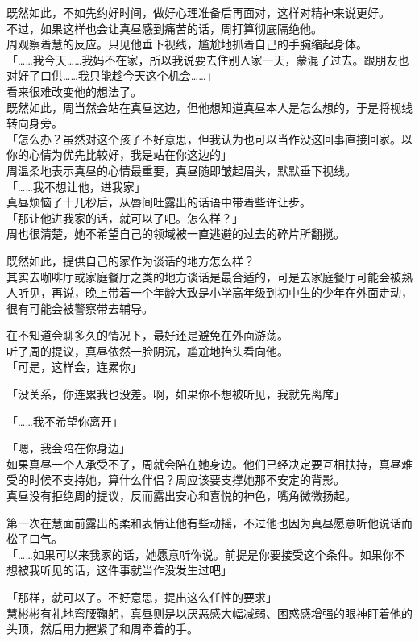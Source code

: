既然如此，不如先约好时间，做好心理准备后再面对，这样对精神来说更好。\\

不过，如果这样也会让真昼感到痛苦的话，周打算彻底隔绝他。\\

周观察着慧的反应。只见他垂下视线，尴尬地抓着自己的手腕缩起身体。\\

「……我今天……我妈不在家，所以我说要去住别人家一天，蒙混了过去。跟朋友也对好了口供……我只能趁今天这个机会……」\\

看来很难改变他的想法了。\\

既然如此，周当然会站在真昼这边，但他想知道真昼本人是怎么想的，于是将视线转向身旁。\\

「怎么办？虽然对这个孩子不好意思，但我认为也可以当作没这回事直接回家。以你的心情为优先比较好，我是站在你这边的」\\

周温柔地表示真昼的心情最重要，真昼随即皱起眉头，默默垂下视线。\\

「……我不想让他，进我家」\\

真昼烦恼了十几秒后，从唇间吐露出的话语中带着些许让步。\\

「那让他进我家的话，就可以了吧。怎么样？」\\

周也很清楚，她不希望自己的领域被一直逃避的过去的碎片所翻搅。

既然如此，提供自己的家作为谈话的地方怎么样？\\

其实去咖啡厅或家庭餐厅之类的地方谈话是最合适的，可是去家庭餐厅可能会被熟人听见，再说，晚上带着一个年龄大致是小学高年级到初中生的少年在外面走动，很有可能会被警察带去辅导。

在不知道会聊多久的情况下，最好还是避免在外面游荡。\\

听了周的提议，真昼依然一脸阴沉，尴尬地抬头看向他。\\

「可是，这样会，连累你」

「没关系，你连累我也没差。啊，如果你不想被听见，我就先离席」

「……我不希望你离开」

「嗯，我会陪在你身边」\\

如果真昼一个人承受不了，周就会陪在她身边。他们已经决定要互相扶持，真昼难受的时候不支持她，算什么伴侣？周应该要支撑她那不安定的背影。\\

真昼没有拒绝周的提议，反而露出安心和喜悦的神色，嘴角微微扬起。

第一次在慧面前露出的柔和表情让他有些动摇，不过他也因为真昼愿意听他说话而松了口气。\\

「……如果可以来我家的话，她愿意听你说。前提是你要接受这个条件。如果你不想被我听见的话，这件事就当作没发生过吧」

「那样，就可以了。不好意思，提出这么任性的要求」\\

慧彬彬有礼地弯腰鞠躬，真昼则是以厌恶感大幅减弱、困惑感增强的眼神盯着他的头顶，然后用力握紧了和周牵着的手。
